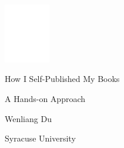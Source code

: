

\begin{titlepage}
	\centering
	\includegraphics[width=0.15\textwidth]{empty.pdf}\par\vspace{2cm}

        {\fontsize{28}{32}\selectfont How I Self-Published My Books \par}
	\vspace{0.2cm}
	{\LARGE A Hands-on Approach\par}
	\vspace{5.2cm}



	{\LARGE Wenliang Du\par}
	\vspace{0.2cm}

	{\Large Syracuse University\par}
	\vfill
\end{titlepage}
